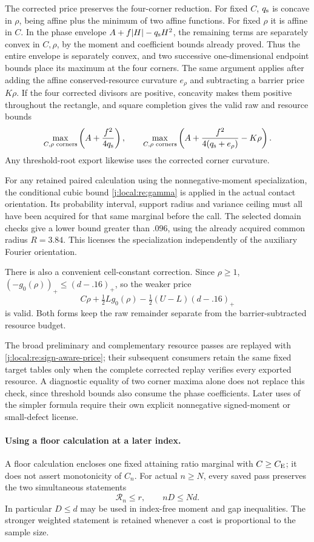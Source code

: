 The corrected price preserves the four-corner reduction. For fixed $C$,
$q_{\rm s}$ is concave in $\rho$, being affine plus the minimum of two
affine functions. For fixed $\rho$ it is affine in $C$. In the phase
envelope $A+f|H|-q_{\rm s}H^2$, the remaining terms are separately
convex in $C,\rho$, by the moment and coefficient bounds already proved.
Thus the entire envelope is separately convex, and two successive
one-dimensional endpoint bounds place its maximum at the four corners.
The same argument applies after adding the affine conserved-resource
curvature $e_\rho$ and subtracting a barrier price $K\rho$.
If the four corrected divisors are positive, concavity makes them
positive throughout the rectangle, and square completion gives the
valid raw and resource bounds
\[
 \max_{C,\rho\text{ corners}}\left(A+\frac{f^2}{4q_{\rm s}}\right),
 \qquad
 \max_{C,\rho\text{ corners}}
       \left(A+\frac{f^2}{4(q_{\rm s}+e_\rho)}-K\rho\right).
\]
Any threshold-root export likewise uses the corrected corner curvature.

For any retained paired calculation using the nonnegative-moment
specialization, the conditional cubic bound \eqref{j:local:re:gamma}
is applied in the actual contact orientation. Its probability interval,
support radius and variance ceiling must all have been acquired for that
same marginal before the call. The selected domain checks give a lower
bound greater than $.096$, using the already acquired common radius
$R=3.84$. This licenses the specialization independently of the auxiliary
Fourier orientation.

There is also a convenient cell-constant correction. Since $\rho\ge1$,
$(-g_0(\rho))_+\le(d-.16)_+$, so the weaker price
\[
 C\rho+\tfrac12L g_0(\rho)
       -\tfrac12(U-L)(d-.16)_+
\]
is valid. Both forms keep the raw remainder separate from the
barrier-subtracted resource budget.

The broad preliminary and complementary resource passes are replayed with
\eqref{j:local:re:sign-aware-price}; their subsequent consumers retain the same
fixed target tables only when the complete corrected replay verifies every
exported resource. A diagnostic equality of two corner maxima alone does
not replace this check, since threshold bounds also consume the phase
coefficients. Later uses of the simpler formula require their own explicit
nonnegative signed-moment or small-defect license.




\paragraph{Using a floor calculation at a later index.}
\label{j:local:transfer}
A floor calculation encloses one fixed attaining ratio marginal with
$C\ge C_{\mathrm E}$; it does not assert monotonicity of $C_n$. For actual
$n\ge N$, every saved pass
preserves the two simultaneous statements
\begin{equation}\label{j:local:ext:floor-invariant}
 \mathcal R_n\le r,\qquad nD\le Nd.
\end{equation}
In particular $D\le d$ may be used in index-free moment and gap
inequalities. The stronger weighted statement is retained whenever a
cost is proportional to the sample size.

